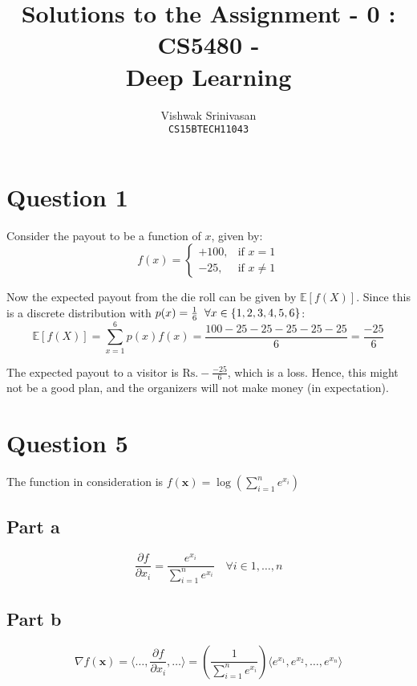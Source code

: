 \documentclass{article}
\title{Solutions to the Assignment - 0 : CS5480 - \\
Deep Learning}
\author{Vishwak Srinivasan\\
\texttt{CS15BTECH11043}}
\date{}
\begin{document}
\maketitle

\section*{Question 1}
\begin{flushleft}
Consider the payout to be a function of \(x\), given by:
\begin{equation}
f(x) = \begin{cases} +100, & \text{if } x = 1 \\ -25, & \text{if } x \neq 1 \end{cases}
\end{equation}

Now the expected payout from the die roll can be given by \(\mathbb{E}[f(X)]\). Since this is a discrete distribution with \(p(x) = \frac{1}{6} \hspace{2mm} \forall x \in \{1, 2, 3, 4, 5, 6\}\):
\begin{equation}
\displaystyle \mathbb{E}[f(X)] = \sum_{x=1}^{6} p(x)f(x) = \frac{100 - 25 - 25 - 25 - 25 - 25}{6} = \frac{-25}{6}
\end{equation}

The expected payout to a visitor is \(\boxed{\text{Rs.} -\frac{-25}{6}}\), which is a loss. Hence, this might not be a good plan, and the organizers will not make money (in expectation).
\end{flushleft}

\section*{Question 5}
The function in consideration is \(f(\mathbf{x}) = \displaystyle \log\left(\sum_{i=1}^{n} e^{x_i}\right)\)
\subsection*{Part a}
\begin{flushleft}
\begin{equation}
\frac{\partial f}{\partial x_{i}} = \frac{e^{x_i}}{\displaystyle \sum_{i=1}^{n} e^{x_i}} \quad \forall i \in 1, \ldots, n
\end{equation}
\end{flushleft}

\subsection*{Part b}
\begin{flushleft}
\begin{equation}
\nabla f(\mathbf{x}) = \langle \ldots, \frac{\partial f}{\partial x_{i}}, \ldots\rangle = \left(\frac{1}{\displaystyle \sum_{i=1}^{n} e^{x_i}}\right) \langle e^{x_1}, e^{x_2}, \ldots, e^{x_n}\rangle
\end{equation}
\end{flushleft}
\end{document}
